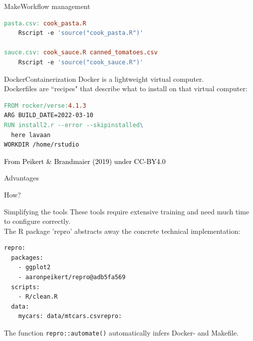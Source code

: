 \documentclass[12pt,t]{beamer}
\begin{document}
{\begin{frame}[c, fragile]{Make\textemdash{}Workflow management}
\begin{lstlisting}[language=make,basicstyle=\ttfamily\scriptsize]
pasta.csv: cook_pasta.R
    Rscript -e 'source("cook_pasta.R")'

sauce.csv: cook_sauce.R canned_tomatoes.csv
    Rscript -e 'source("cook_sauce.R")'
\end{lstlisting}
\end{frame}

\begin{frame}[c, fragile]{Docker\textemdash{}Containerization}
	Docker is a lightweight virtual computer.\\
	Dockerfiles are ``recipes" that describe what to install on that virtual computer:
	\vspace{10mm}
	\begin{lstlisting}[language=make,basicstyle=\ttfamily\scriptsize]
FROM rocker/verse:4.1.3
ARG BUILD_DATE=2022-03-10
RUN install2.r --error --skipinstalled\
  here lavaan
WORKDIR /home/rstudio
\end{lstlisting}
\end{frame}

  \begin{frame}[plain]
  \vspace{8cm}
  \scriptsize \hfill{}\textcolor{black}{From Peikert \& Brandmaier (2019) under CC-BY4.0}
  \end{frame}
}

\begin{frame}[c]{Advantages}
	\begin{center}
	\end{center}
\end{frame}

\begin{frame}[c]
  \begin{center}
    \Huge \textcolor{hilit}{How?}
  \end{center}
\end{frame}

\begin{frame}[c, fragile]{Simplifying the tools}
\textcolor<2->{lolit}{These tools require extensive training and need much time to configure correctly.\\}
\onslide<2->The R package 'repro' abstracts away the concrete technical implementation:\\
\begin{lstlisting}[basicstyle=\ttfamily\scriptsize]
repro:
  packages:
    - ggplot2
    - aaronpeikert/repro@adb5fa569
  scripts:
    - R/clean.R
  data:
    mycars: data/mtcars.csvrepro:
\end{lstlisting}
The function \lstinline|repro::automate()| automatically infers Docker- and Makefile.
\end{frame}
\end{document}
